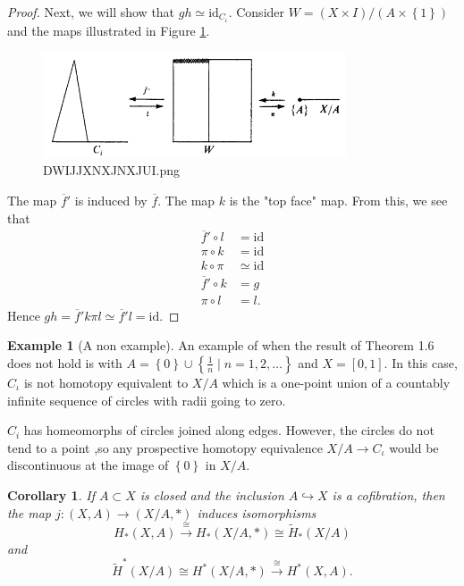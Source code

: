 \documentclass[reqno]{amsart}
\newtheorem{corollary}[theorem]{Corollary}
\theoremstyle{definition}
\newtheorem{example}[theorem]{Example}
\theoremstyle{remark}
\newcommand{\id}{{\mathrm{id}}}
\begin{document}
\begin{proof}
    Next, we will show that $gh \simeq \id_{C_{\iota}}$.
    Consider $W = \left( X \times I \right) / 
    \left( A \times \left\{ 1 \right\}  \right) $ 
    and the maps illustrated in Figure \ref{fig:DWIJJXNXJNXJUI-png}.

    \begin{figure}[htpb]
        \centering
        \includegraphics[width=0.8\textwidth]{DWIJJXNXJNXJUI.png}
        \caption{DWIJJXNXJNXJUI.png}
        \label{fig:DWIJJXNXJNXJUI-png}
    \end{figure}
    The map $\overline{f}'$ is induced by
    $\overline{f}$. The map
    $k$ is the "top face" map.
    From this, we see that
    \begin{align*}
        \overline{f}' \circ l 
        &= \id \\
        \pi \circ k 
        &= \id \\
        k \circ \pi 
        &\simeq \id \\
        \overline{f}' \circ k
        &= g \\
        \pi \circ l 
        &= l.
    \end{align*}
   Hence $g h = \overline{f}' k \pi l 
   \simeq \overline{f}' l = \id$. 
\end{proof}


\begin{example}[A non example]
    An example of when the result
    of Theorem 1.6 does not hold is with
    $A = \left\{ 0 \right\} \cup 
    \left\{ \frac{1}{n} \mid n = 1, 2, \ldots \right\} $ 
    and $X = \left[ 0,1 \right] $.
    In this case, $C_{\iota}$ is not homotopy equivalent
    to $X / A$ which is a one-point union of a countably infinite
    sequence of circles with radii going to zero.

    $C_i$ has homeomorphs of circles joined along edges. However,
    the circles do not tend to a point ,so any prospective homotopy
    equivalence $X / A \to C_{\iota}$ would be discontinuous at
    the image of $\left\{ 0 \right\} $ in $X / A$.
\end{example}

\begin{corollary}\label{Cor:Cofibration-Homology}
    If $A \subset X$ is closed and the inclusion
    $A \hookrightarrow X$ is a cofibration, then the map
    $j \colon \left( X, A \right) \to 
    \left( X / A, * \right) $ induces isomorphisms
    \[
    H_* (X,A) \stackrel{\cong}{\to} 
    H_* \left( X / A, * \right) 
    \cong \tilde{H}_* \left( X / A \right) 
    \] 
    and
    \[
    \tilde{H}^{*}(X /A) \cong
    H^{*} (X / A, *) 
    \stackrel{\cong}{\to} H^{*} (X , A).
    \] 
\end{corollary}
\end{document}
